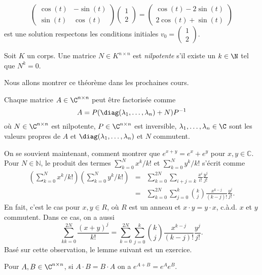 \begin{example}
\begin{displaymath}
\begin{pmatrix}
    \cos(t)&-\sin(t)\\
    \sin(t)&\cos(t)
  \end{pmatrix} \begin{pmatrix}
    1\\
    2
\end{pmatrix}   =  \begin{pmatrix}
    \cos(t)-2\sin(t)\\
    2\cos(t)+\sin(t)
\end{pmatrix} 
\end{displaymath}
est une solution respectons les conditions initiales  $v_0 = 
\begin{pmatrix}
    1\\
    2
\end{pmatrix} $. 
\end{example}






\begin{definition}
  \label{def:29}Soit $K$ un corps. 
  Une matrice $N ∈ K^{n ×n}$ est \emph{nilpotente} s'il existe un $k \in \N$ tel que $N^k = 0$. 
\end{definition}

Nous allons montrer ce théorème dans les prochaines cours.  
\begin{theorem}
  \label{thr:32}
  Chaque matrice $A \in \C^{n \times n}$ peut être factorisée comme 
  \begin{displaymath}
    A = P ( \diag(\lambda_1,\dots,\lambda_n) + N) P^{-1}
  \end{displaymath}
où $N \in \C^{n \times n}$ est nilpotente, $P \in \C^{n \times n}$ est inversible,  $\lambda_1,\dots,\lambda_n \in \C$ sont les valeurs propres de $A$ et $\diag(\lambda_1,\dots,\lambda_n)$ et $N$ commutent. 
\end{theorem}
%
On se souvient maintenant, comment montrer que $e^{x+y}  = e^x + e^y$ pour $x,y∈ ℂ$.  Pour $N ∈ ℕ$, le produit des termes
$∑_{k=0}^N x^k / k! $ et $∑_{k=0}^N y^k / k! $ s'écrit comme 
\begin{eqnarray}
  \left(∑_{k=0}^N x^k / k! \right) \left(∑_{k=0}^N y^k / k! \right) & = & \displaystyle  ∑_{k=0}^{2N}  ∑_{i+j = k} \frac{x^i}{  i!} \frac{y^j}{ j!} \\
  & = &  \displaystyle ∑_{k=0}^{2N}  ∑_{j = 0}^k \binom{k}{j} \frac{x^{k-j} }{(k-j)!} \frac{y^{j} }{j!}.   
\end{eqnarray}
En fait, c'est le cas pour $x,y ∈ R$, où $R$ est un anneau et $x ⋅ y  = y ⋅x$, c.à.d. $x$ et $y$ commutent.  Dans ce cas, on a aussi
\begin{displaymath}
  \displaystyle  ∑_{kk=0}^{2N} \frac{(x+y)^j}{k!} =  \displaystyle  ∑_{k=0}^{2N}  ∑_{j = 0}^k \binom{k}{j} \frac{x^{k-j} }{(k-j)!} \frac{y^{j} }{j!}.   
\end{displaymath}
%
Basé sur cette observation, le lemme suivant est un exercice. 
\begin{lemma}
  \label{lem:18}
  Pour $A,B \in \C^{n \times n}$, si $A\cdot B = B \cdot A$ on a $e^{A+B} = e^A e^B$. 
\end{lemma}



